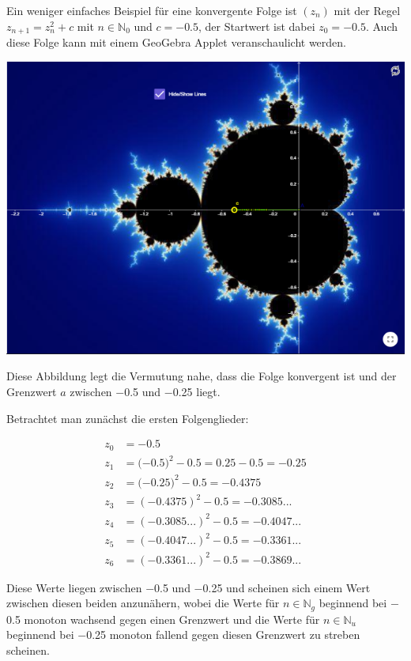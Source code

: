 \documentclass[a4paper, 12pt]{book}
\begin{document}
Ein weniger einfaches Beispiel für eine konvergente Folge ist
\(\left( z_{n} \right)\) mit der Regel \(z_{n + 1} = z_{n}^{2} + c\) mit
\(n \in \mathbb{N}_{0}\) und \(c =  - 0.5\), der Startwert ist dabei
\(z_{0} =  - 0.5\). Auch diese Folge kann mit einem GeoGebra Applet
veranschaulicht werden.

\begin{center}
\includegraphics[width=0.5\linewidth]{image12.png}
\end{center}


Diese Abbildung legt die Vermutung nahe, dass die Folge konvergent ist
und der Grenzwert \(a\) zwischen \(-\)0.5 und \(-\)0.25 liegt.


Betrachtet man zunächst die ersten Folgenglieder:

\begin{align*}
z_{0} &=  - 0.5\\
z_{1} &= ( - {0.5)}^{2} - 0.5 = 0.25 - 0.5 =  - 0.25\\
z_{2} &= ( - {0.25)}^{2} - 0.5 =  - 0.4375\\
z_{3} &= {( - 0.4375)}^{2} - 0.5 =  - 0.3085...\\
z_{4} &= {( - 0.3085...)}^{2} - 0.5 =  - 0.4047...\\
z_{5} &= {( - 0.4047...)}^{2} - 0.5 =  - 0.3361...\\
z_{6} &= {( - 0.3361...)}^{2} - 0.5 =  - 0.3869...
\end{align*}

Diese Werte liegen zwischen \(-\)0.5 und \(-\)0.25 und scheinen sich
einem Wert zwischen diesen beiden anzunähern, wobei die Werte für
\(n \in \mathbb{N}_{g}\) beginnend bei \(-\)0.5 monoton wachsend
gegen einen Grenzwert und die Werte für \(n \in \mathbb{N}_{u}\)
beginnend bei \(-\)0.25 monoton fallend gegen diesen Grenzwert zu
streben scheinen.
\end{document}
